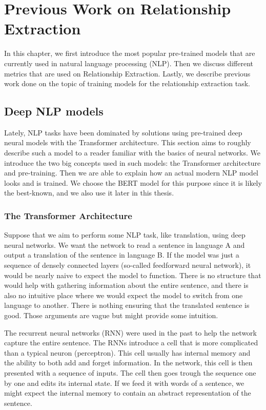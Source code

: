 \chapter{Previous Work on Relationship Extraction}
In this chapter, we first introduce the most popular pre-trained models that are currently used in natural language processing (NLP). Then we discuss different metrics that are used on Relationship Extraction. Lastly, we describe previous work done on the topic of training models for the relationship extraction task.

\section{Deep NLP models}
Lately, NLP tasks have been dominated by solutions using pre-trained deep neural models with the Transformer architecture. This section aims to roughly describe such a model to a reader familiar with the basics of neural networks. We introduce the two big concepts used in such models: the Transformer architecture and pre-training. Then we are able to explain how an actual modern NLP model looks and is trained. We choose the BERT model for this purpose since it is likely the best-known, and we also use it later in this thesis. 



\subsection{The Transformer Architecture}
Suppose that we aim to perform some NLP task, like translation, using deep neural networks. We want the network to read a sentence in language A and output a translation of the sentence in language B. If the model was just a sequence of densely connected layers (so-called feedforward neural network), it would be nearly naive to expect the model to function. There is no structure that would help with gathering information about the entire sentence, and there is also no intuitive place where we would expect the model to switch from one language to another. There is nothing ensuring that the translated sentence is good. Those arguments are vague but might provide some intuition.

The recurrent neural networks (RNN) were used in the past to help the network capture the entire sentence. The RNNs introduce a cell that is more complicated than a typical neuron (perceptron). This cell usually has internal memory and the ability to both add and forget information. In the network, this cell is then presented with a sequence of inputs. The cell then goes trough the sequence one by one and edits its internal state. If we feed it with words of a sentence, we might expect the internal memory to contain an abstract representation of the sentence. 

